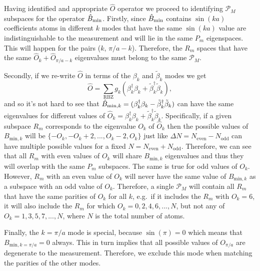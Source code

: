 Having identified and appropriate $\hat{O}$ operator we proceed to
identifying $\mathcal{P}_M$ subspaces for the operator
$\hat{B}_\mathrm{min}$. Firstly, since $\hat{B}_\mathrm{min}$ contains $\sin(ka)$ coefficients atoms
in different $k$ modes that have the same $\sin(ka)$ value are
indistinguishable to the measurement and will lie in the same $P_m$
eigenspaces. This will happen for the pairs ($k$, $\pi/a -
k$). Therefore, the $R_m$ spaces that have the same
$\hat{O}_k + \hat{O}_{\pi/a - k}$ eigenvalues must belong to the same
$\mathcal{P}_M$.

Secondly, if we re-write $\hat{O}$ in terms of the $\beta_k$ and
$\tilde{\beta}_k$ modes we get
\begin{equation} 
  \hat{O} = \sum_{\mathrm{RBZ}} g_k \left(
    \beta^\dagger_k \beta_k + \tilde{\beta}_k^\dagger \tilde{\beta}_k
  \right),
\end{equation}
and so it's not hard to see that
$\hat{B}_{\mathrm{min},k} = (\beta^\dagger_k \beta_k -
\tilde{\beta}_k^\dagger \tilde{\beta}_k)$ can have the same
eigenvalues for different values of
$\hat{O}_k = \beta^\dagger_k \beta_k + \tilde{\beta}_k^\dagger
\tilde{\beta}_k$. Specifically, if a given subspace $R_m$ corresponds
to the eigenvalue $O_k$ of $\hat{O}_k$ then the possible values of
$B_{\mathrm{min},k}$ will be $\{-O_k, -O_k + 2, ..., O_k - 2, O_k\}$
just like $\Delta N = N_\mathrm{even} - N_\mathrm{odd}$ can have
multiple possible values for a fixed
$N = N_\mathrm{even} + N_\mathrm{odd}$. Therefore, we can see that all
$R_m$ with even values of $O_k$ will share $B_{\mathrm{min},k}$
eigenvalues and thus they will overlap with the same $P_m$
subspaces. The same is true for odd values of $O_k$. However, $R_m$
with an even value of $O_k$ will never have the same value of
$B_{\mathrm{min},k}$ as a subspace with an odd value of
$O_k$. Therefore, a single $\mathcal{P}_M$ will contain all $R_m$ that
have the same parities of $O_k$ for all $k$, e.g.~if it includes the
$R_m$ with $O_k = 6$, it will also include the $R_m$ for which
$O_k = 0, 2, 4, 6, ..., N$, but not any of $O_k = 1, 3, 5, 7, ..., N$,
where $N$ is the total number of atoms.

Finally, the $k = \pi/a$ mode is special, because $\sin(\pi) = 0$
which means that $B_{\mathrm{min},k=\pi/a} = 0$ always. This in turn
implies that all possible values of $O_{\pi/a}$ are degenerate to the
measurement. Therefore, we exclude this mode when matching the
parities of the other modes.

